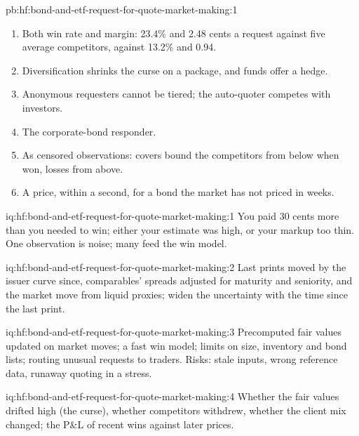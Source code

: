 \begin{solution}{pb:hf:bond-and-etf-request-for-quote-market-making:1}
\begin{enumerate}
\item Both win rate and margin: 23.4\% and 2.48 cents a request against five average competitors, against 13.2\% and 0.94.
\item Diversification shrinks the curse on a package, and funds offer a hedge.
\item Anonymous requesters cannot be tiered; the auto-quoter competes with investors.
\item The corporate-bond responder.
\item As censored observations: covers bound the competitors from below when won, losses from above.
\item A price, within a second, for a bond the market has not priced in weeks.
\end{enumerate}
\end{solution}

\begin{solution}{iq:hf:bond-and-etf-request-for-quote-market-making:1}
You paid 30 cents more than you needed to win; either your estimate was high, or your markup too thin. One observation is noise; many feed the win
model.
\end{solution}

\begin{solution}{iq:hf:bond-and-etf-request-for-quote-market-making:2}
Last prints moved by the issuer curve since, comparables' spreads adjusted for maturity and seniority, and the market move from liquid proxies; widen
the uncertainty with the time since the last print.
\end{solution}

\begin{solution}{iq:hf:bond-and-etf-request-for-quote-market-making:3}
Precomputed fair values updated on market moves; a fast win model; limits on size, inventory and bond lists; routing unusual requests to traders.
Risks: stale inputs, wrong reference data, runaway quoting in a stress.
\end{solution}

\begin{solution}{iq:hf:bond-and-etf-request-for-quote-market-making:4}
Whether the fair values drifted high (the curse), whether competitors withdrew, whether the client mix changed; the P\&L of recent wins against later
prices.
\end{solution}

